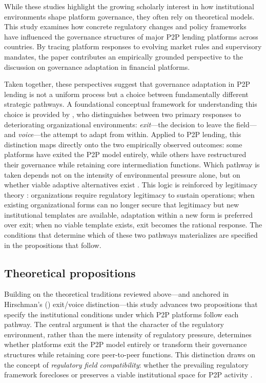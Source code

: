 \documentclass[pdflatex,sn-apa]{sn-jnl}%
\theoremstyle{thmstyleone}%
\theoremstyle{thmstyletwo}%
\theoremstyle{thmstylethree}%
\begin{document}
\textcolor{NavyBlue}{While these studies highlight the growing scholarly interest in how institutional environments shape platform governance, they often rely on theoretical models. This study examines how concrete regulatory changes and policy frameworks have influenced the governance structures of major P2P lending platforms across countries. By tracing platform responses to evolving market rules and supervisory mandates, the paper contributes an empirically grounded perspective to the discussion on governance adaptation in financial platforms.}

\textcolor{NavyBlue}{Taken together, these perspectives suggest that governance adaptation in P2P lending is not a uniform process but a choice between fundamentally different strategic pathways. A foundational conceptual framework for understanding this choice is provided by \citet{Hirschman1972}, who distinguishes between two primary responses to deteriorating organizational environments: \textit{exit}---the decision to leave the field---and \textit{voice}---the attempt to adapt from within. Applied to P2P lending, this distinction maps directly onto the two empirically observed outcomes: some platforms have exited the P2P model entirely, while others have restructured their governance while retaining core intermediation functions. Which pathway is taken depends not on the intensity of environmental pressure alone, but on whether viable adaptive alternatives exist \citep{Hirschman1972}. This logic is reinforced by legitimacy theory \citep{Suchman1995}: organizations require regulatory legitimacy to sustain operations; when existing organizational forms can no longer secure that legitimacy but new institutional templates are available, adaptation within a new form is preferred over exit; when no viable template exists, exit becomes the rational response. The conditions that determine which of these two pathways materializes are specified in the propositions that follow.}

\subsection{Theoretical propositions}\label{sec:propositions}

\textcolor{NavyBlue}{Building on the theoretical traditions reviewed above---and anchored in Hirschman's (\citeyear{Hirschman1972}) exit/voice distinction---this study advances two propositions that specify the institutional conditions under which P2P platforms follow each pathway. The central argument is that the character of the regulatory environment, rather than the mere intensity of regulatory pressure, determines whether platforms exit the P2P model entirely or transform their governance structures while retaining core peer-to-peer functions. This distinction draws on the concept of \textit{regulatory field compatibility}: whether the prevailing regulatory framework forecloses or preserves a viable institutional space for P2P activity \citep{DiMaggio1983, Zetzsche2018}.}
\end{document}
